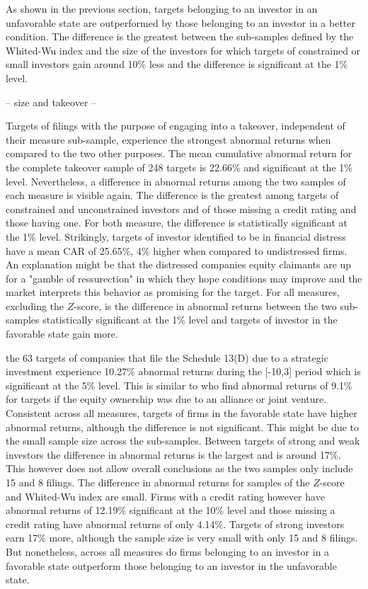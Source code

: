 \documentclass[12pt]{article}
\begin{document}
As shown in the previous section, targets belonging to an investor in an unfavorable state are outperformed by those belonging to an investor in a better condition. The difference is the greatest between the sub-samples defined by the Whited-Wu index and the size of the investors for which targets of constrained or small investors gain around 10\% less and the difference is significant at the 1\% level. 
\begin{center}
	-- size and takeover -- 
\end{center}
Targets of filings with the purpose of engaging into a takeover, independent of their measure sub-sample, experience the strongest abnormal returns when compared to the two other purposes. The mean cumulative abnormal return for the complete takeover sample of 248 targets is 22.66\% and significant at the 1\% level. 
Nevertheless, a difference in abnormal returns among the two samples of each measure is visible again. The difference is the greatest among targets of constrained and unconstrained investors and of those missing a credit rating and those having one. For both measure, the difference is statistically significant at the 1\% level. Strikingly, targets of investor identified to be in financial distress have a mean CAR of 25.65\%, 4\% higher when compared to undistressed firms. An explanation might be that the distressed companies equity claimants are up for a "gamble of ressurection" \citep[p.451]{Bhagat2005} in which they hope conditions may improve and the market interprets this behavior as promising for the target. For all measures, excluding the $Z$-score, is the difference in abnormal returns between the two sub-samples statistically significant at the 1\% level and targets of investor in the favorable state gain more.

the 63 targets of companies that file the Schedule 13(D) due to a strategic investment experience 10.27\% abnormal returns during the [-10,3] period which is significant at the 5\% level. This is similar to \citet[p.2803]{Allen2000} who find abnormal returns of 9.1\% for targets if the equity ownership was due to an alliance or joint venture. Consistent across all measures, targets of firms in the favorable state have higher abnormal returns, although the difference is not significant. This might be due to the small sample size across the sub-samples. Between targets of strong and weak investors the difference in abnormal returns is the largest and is around 17\%. This however does not allow overall conclusions as the two samples only include 15 and 8 filings. The difference in abnormal returns for samples of the $Z$-score and Whited-Wu index are small. Firms with a credit rating however have abnormal returns of 12.19\% significant at the 10\% level and those missing a credit rating have abnormal returns of only 4.14\%. 
Targets of strong investors earn 17\% more, although the sample size is very small with only 15 and 8 filings. But nonetheless, across all measures do firms belonging to an investor in a favorable state outperform those belonging to an investor in the unfavorable state. 
\end{document}

